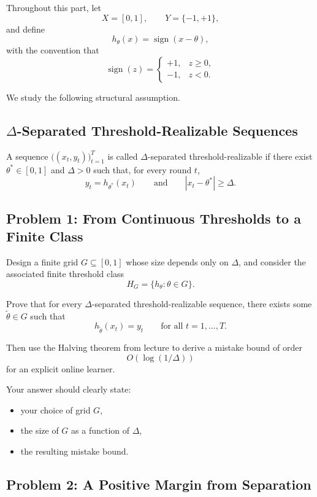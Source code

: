 \documentclass{article}
\begin{document}
Throughout this part, let
$$
X = [0,1], \qquad Y = \{-1,+1\},
$$
and define
$$
h_\theta(x) = \operatorname{sign}(x-\theta),
$$
with the convention that
$$
\operatorname{sign}(z) =
\begin{cases}
+1, & z \ge 0, \\
-1, & z < 0.
\end{cases}
$$

We study the following structural assumption.

\subsection*{$\Delta$-Separated Threshold-Realizable Sequences}

A sequence $\bigl((x_t,y_t)\bigr)_{t=1}^T$ is called $\Delta$-separated threshold-realizable if there exist $\theta^* \in [0,1]$ and $\Delta > 0$ such that, for every round $t$,
$$
y_t = h_{\theta^*}(x_t)
\qquad \text{and} \qquad
|x_t-\theta^*| \ge \Delta.
$$

\subsection*{Problem 1: From Continuous Thresholds to a Finite Class}

Design a finite grid $G \subseteq [0,1]$ whose size depends only on $\Delta$, and consider the associated finite threshold class
$$
H_G = \{h_\theta : \theta \in G\}.
$$

Prove that for every $\Delta$-separated threshold-realizable sequence, there exists some $\widetilde{\theta} \in G$ such that
$$
h_{\widetilde{\theta}}(x_t) = y_t
\qquad \text{for all } t=1,\dots,T.
$$

Then use the Halving theorem from lecture to derive a mistake bound of order
$$
O(\log(1/\Delta))
$$
for an explicit online learner.

Your answer should clearly state:
\begin{itemize}
\item your choice of grid $G$,
\item the size of $G$ as a function of $\Delta$,
\item the resulting mistake bound.
\end{itemize}

\subsection*{Problem 2: A Positive Margin from Separation}
\end{document}
